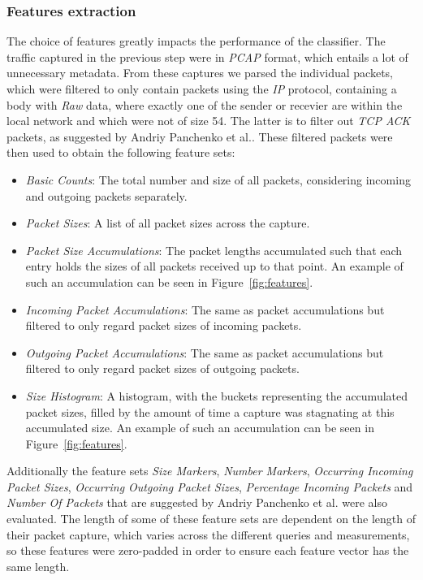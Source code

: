 \documentclass[9pt,conference]{IEEEtran}
\begin{document}
\subsubsection{Features extraction}
The choice of features greatly impacts the performance of the classifier. The traffic captured in the previous step were in \textit{PCAP} format, which entails a lot of unnecessary metadata. From these captures we parsed the individual packets, which were filtered to only contain packets using the \textit{IP} protocol, containing a body with \textit{Raw} data, where exactly one of the sender or recevier are within the local network and which were not of size 54. The latter is to filter out \textit{TCP ACK} packets, as suggested by Andriy Panchenko et al.\cite{panchenko2011website}. These filtered packets were then used to obtain the following feature sets:
\begin{itemize}
    \item \textit{Basic Counts}: The total number and size of all packets, considering incoming and outgoing packets separately.
    \item \textit{Packet Sizes}: A list of all packet sizes across the capture.
    \item \textit{Packet Size Accumulations}: The packet lengths accumulated such that each entry holds the sizes of all packets received up to that point. An example of such an accumulation can be seen in Figure~\ref{fig:features}.
    \item \textit{Incoming Packet Accumulations}: The same as packet accumulations but filtered to only regard packet sizes of incoming packets.
    \item \textit{Outgoing Packet Accumulations}: The same as packet accumulations but filtered to only regard packet sizes of outgoing packets.
    \item \textit{Size Histogram}: A histogram, with the buckets representing the accumulated packet sizes, filled by the amount of time a capture was stagnating at this accumulated size. An example of such an accumulation can be seen in Figure~\ref{fig:features}.
\end{itemize}

Additionally the feature sets \textit{Size Markers}, \textit{Number Markers}, \textit{Occurring Incoming Packet Sizes}, \textit{Occurring Outgoing Packet Sizes}, \textit{Percentage Incoming Packets} and \textit{Number Of Packets} that are suggested by Andriy Panchenko et al.\cite{panchenko2011website} were also evaluated. The length of some of these feature sets are dependent on the length of their packet capture, which varies across the different queries and measurements, so these features were zero-padded in order to ensure each feature vector has the same length.
\end{document}
